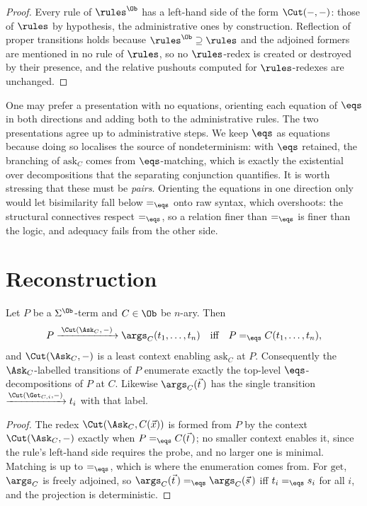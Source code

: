 \begin{proof}
Every rule of $\rules^{\Ob}$ has a left-hand side of the form $\Cut(-,-)$: those of
$\rules$ by hypothesis, the administrative ones by construction. Reflection of
proper transitions holds because $\rules^{\Ob} \supseteq \rules$ and the adjoined
formers are mentioned in no rule of $\rules$, so no $\rules$-redex is created or
destroyed by their presence, and the relative pushouts computed for
$\rules$-redexes are unchanged.
\end{proof}

\begin{remark}
\label{ox:rem:pairs}
One may prefer a presentation with no equations, orienting each equation of
$\eqs$ in both directions and adding both to the administrative rules. The two
presentations agree up to administrative steps. We keep $\eqs$ as equations
because doing so localises the source of nondeterminism: with $\eqs$ retained, the
branching of $\mathrm{ask}_C$ comes from $\eqs$-matching, which is exactly the
existential over decompositions that the separating conjunction quantifies. It is
worth stressing that these must be \emph{pairs}. Orienting the equations in one
direction only would let bisimilarity fall below $=_{\eqs}$ onto raw syntax, which
overshoots: the structural connectives respect $=_{\eqs}$, so a relation finer than
$=_{\eqs}$ is finer than the logic, and adequacy fails from the other side.
\end{remark}

\section{Reconstruction}
\label{ox:sec:recon}

\begin{lemma}[Exposure]
\label{ox:lem:exposure}
Let $P$ be a $\Sigma^{\Ob}$-term and $C \in \Ob$ be $n$-ary. Then
\[
  P \xrightarrow{\;\Cut(\Ask_C,\,-)\;} \args_C(t_1,\dots,t_n)
  \quad\text{iff}\quad
  P =_{\eqs} C(t_1,\dots,t_n),
\]
and $\Cut(\Ask_C,-)$ is a least context enabling $\mathrm{ask}_C$ at $P$.
Consequently the $\Ask_C$-labelled transitions of $P$ enumerate exactly the
top-level $\eqs$-decompositions of $P$ at $C$. Likewise $\args_C(\vec t\,)$ has the
single transition $\xrightarrow{\Cut(\Get_{C,i},-)} t_i$ with that label.
\end{lemma}

\begin{proof}
The redex $\Cut(\Ask_C, C(\vec x))$ is formed from $P$ by the context
$\Cut(\Ask_C,-)$ exactly when $P =_{\eqs} C(\vec t\,)$; no smaller context enables
it, since the rule's left-hand side requires the probe, and no larger one is
minimal. Matching is up to $=_{\eqs}$, which is where the enumeration comes from.
For $\mathrm{get}$, $\args_C$ is freely adjoined, so
$\args_C(\vec t\,) =_{\eqs} \args_C(\vec s\,)$ iff $t_i =_{\eqs} s_i$ for all $i$,
and the projection is deterministic.
\end{proof}

